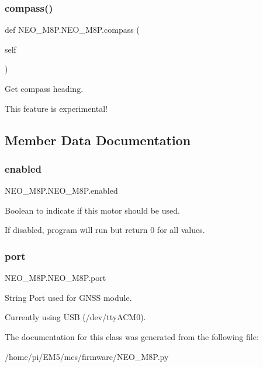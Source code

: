 \subsubsection{\texorpdfstring{compass()}{compass()}}
{\footnotesize\ttfamily def N\+E\+O\+\_\+\+M8\+P.\+N\+E\+O\+\_\+\+M8\+P.\+compass (\begin{DoxyParamCaption}\item[{}]{self }\end{DoxyParamCaption})}



Get compass heading. 

This feature is experimental! 

\subsection{Member Data Documentation}
\mbox{\label{classNEO__M8P_1_1NEO__M8P_af7c5a97b95ae3125ccf22b7a322ac71b}} 
\subsubsection{\texorpdfstring{enabled}{enabled}}
{\footnotesize\ttfamily N\+E\+O\+\_\+\+M8\+P.\+N\+E\+O\+\_\+\+M8\+P.\+enabled}



Boolean to indicate if this motor should be used. 

If disabled, program will run but return 0 for all values. \mbox{\label{classNEO__M8P_1_1NEO__M8P_a1eb6a0afe8bd7796703c9d48d51fe41b}} 
\subsubsection{\texorpdfstring{port}{port}}
{\footnotesize\ttfamily N\+E\+O\+\_\+\+M8\+P.\+N\+E\+O\+\_\+\+M8\+P.\+port}



String Port used for G\+N\+SS module. 

Currently using U\+SB (/dev/tty\+A\+C\+M0). 

The documentation for this class was generated from the following file\+:\begin{DoxyCompactItemize}
\item 
/home/pi/\+E\+M5/mcs/firmware/N\+E\+O\+\_\+\+M8\+P.\+py\end{DoxyCompactItemize}
